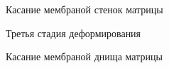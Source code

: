 		\begin{figure}[h!]	
				\def\svgwidth{\columnwidth}
				\caption{Касание мембраной стенок матрицы} 
				\label{animation2}
		\end{figure}
				\begin{figure}[h!]	
				\def\svgwidth{\columnwidth}
				\caption{Третья стадия деформирования} 
				\label{animation3}
		\end{figure}
				\begin{figure}[h!]	
				\def\svgwidth{\columnwidth}
				\caption{Касание мембраной днища матрицы} 
				\label{animation4}
		\end{figure}
